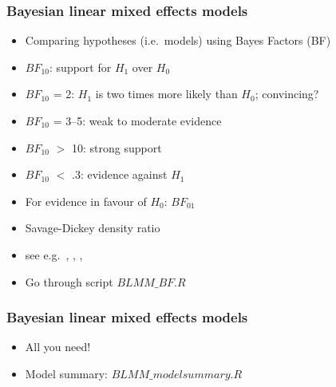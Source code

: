 \begin{frame}
	\frametitle{Bayesian linear mixed effects models}
	\begin{itemize}
		\item Comparing hypotheses (i.e.~models) using Bayes Factors (BF)
		\item $BF_{10}$: support for $H_1$ over $H_0$  
		\item $BF_{10}$ = 2: $H_1$ is two times more likely than $H_0$; convincing?
		\item $BF_{10}$ = 3--5: weak to moderate evidence
		\item $BF_{10}$ $>$ 10: strong support
		\item $BF_{10}$ $<$ .3: evidence against $H_1$
		\item For evidence in favour of $H_0$: $BF_{01}$
		\item Savage-Dickey density ratio \cite{dickey1970weighted}		
		\item see e.g.~, ,  , 
		\item Go through script $BLMM\_BF.R$				 
	\end{itemize}
	
\end{frame}






\begin{frame}
	\frametitle{Bayesian linear mixed effects models}
	\begin{itemize}
		\item All you need!		
		\item Model summary: $BLMM\_modelsummary.R$
	\end{itemize}
\end{frame}



